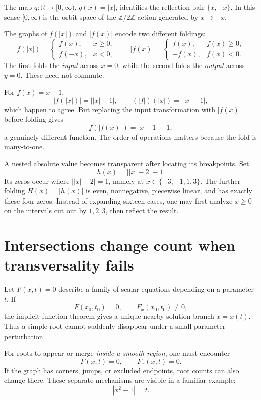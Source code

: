The map \(q:\mathbb R\to[0,\infty)\), \(q(x)=|x|\), identifies the reflection pair \(\{x,-x\}\). In this sense \([0,\infty)\) is the orbit space of the \(\mathbb Z/2\mathbb Z\) action generated by \(x\mapsto-x\).

The graphs of \(f(|x|)\) and \(|f(x)|\) encode two different foldings:
\[
 f(|x|)=
 \begin{cases}f(x),&x\ge0,\\f(-x),&x<0,\end{cases}
 \qquad
 |f(x)|=
 \begin{cases}f(x),&f(x)\ge0,\\-f(x),&f(x)<0.\end{cases}
\]
The first folds the \emph{input} across \(x=0\), while the second folds the \emph{output} across \(y=0\). These need not commute.

For \(f(x)=x-1\),
\[
 |f(|x|)|=\bigl||x|-1\bigr|,
 \qquad
 (|f|)(|x|)=\bigl||x|-1\bigr|,
\]
which happen to agree. But replacing the input transformation with \(|f(x)|\) before folding gives
\[
 f(|f(x)|)=|x-1|-1,
\]
a genuinely different function. The order of operations matters because the fold is many-to-one.

A nested absolute value becomes transparent after locating its breakpoints. Set
\[
 h(x)=\bigl||x|-2\bigr|-1.
\]
Its zeros occur where \(\bigl||x|-2\bigr|=1\), namely at
\(x\in\{-3,-1,1,3\}\). The further folding \(H(x)=|h(x)|\) is even, nonnegative, piecewise linear, and has exactly these four zeros. Instead of expanding sixteen cases, one may first analyze \(x\ge0\) on the intervals cut out by \(1,2,3\), then reflect the result.

\section{Intersections change count when transversality fails}

Let \(F(x,t)=0\) describe a family of scalar equations depending on a parameter \(t\). If
\[
 F(x_0,t_0)=0,\qquad F_x(x_0,t_0)\ne0,
\]
the implicit function theorem gives a unique nearby solution branch \(x=x(t)\). Thus a simple root cannot suddenly disappear under a small parameter perturbation.

For roots to appear or merge \emph{inside a smooth region}, one must encounter
\[
 F(x,t)=0,\qquad F_x(x,t)=0.
\]
If the graph has corners, jumps, or excluded endpoints, root counts can also change there. These separate mechanisms are visible in a familiar example:
\[
 |x^2-1|=t.
\]

